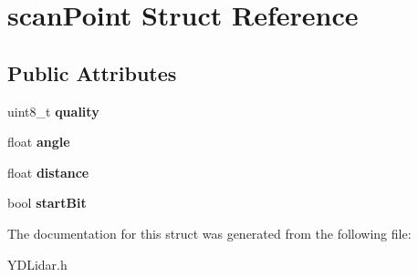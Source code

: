 \hypertarget{structscan_point}{}\section{scan\+Point Struct Reference}
\label{structscan_point}
\subsection*{Public Attributes}
\begin{DoxyCompactItemize}
\item 
uint8\+\_\+t {\bfseries quality}\hypertarget{structscan_point_a502ae27491219d291f330ffa1fc72216}{}\label{structscan_point_a502ae27491219d291f330ffa1fc72216}

\item 
float {\bfseries angle}\hypertarget{structscan_point_afa9b93eff938207c13f262ae8c94c215}{}\label{structscan_point_afa9b93eff938207c13f262ae8c94c215}

\item 
float {\bfseries distance}\hypertarget{structscan_point_a306deb9f6aae76e056afd90d21b553cc}{}\label{structscan_point_a306deb9f6aae76e056afd90d21b553cc}

\item 
bool {\bfseries start\+Bit}\hypertarget{structscan_point_abb340771310ad82bb10f10d94d3ebd0f}{}\label{structscan_point_abb340771310ad82bb10f10d94d3ebd0f}

\end{DoxyCompactItemize}


The documentation for this struct was generated from the following file\+:\begin{DoxyCompactItemize}
\item 
Y\+D\+Lidar.\+h\end{DoxyCompactItemize}
